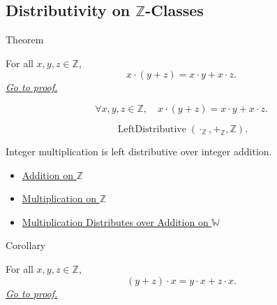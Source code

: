 \subsection*{\texorpdfstring{Distributivity on $\mathbb{Z}$-Classes}{Distributivity on Z-Classes}}

\begin{theorembox}{Theorem}
\begin{theorem}
\label{thm:left-distributivity-on-z}
For all $x,y,z\in\mathbb{Z}$,
\[
x\cdot(y+z)=x\cdot y+x\cdot z.
\]
\hyperref[prf:left-distributivity-on-z]{\textit{Go to proof.}}
\end{theorem}
\end{theorembox}

\begin{remark*}
\[
\forall x,y,z\in\mathbb{Z},\quad
x\cdot(y+z)=x\cdot y+x\cdot z.
\]
\end{remark*}

\begin{remark*}
\[
\operatorname{LeftDistributive}(\cdot_{\mathbb{Z}},+_{\mathbb{Z}},\mathbb{Z}).
\]
\end{remark*}

\begin{remark*}[Interpretation]
Integer multiplication is left distributive over integer addition.
\end{remark*}

\begin{dependencies}
\begin{itemize}
  \item \hyperref[def:addition-on-z-classes]{Addition on $\mathbb{Z}$}
  \item \hyperref[def:multiplication-on-z-classes]{Multiplication on $\mathbb{Z}$}
  \item \hyperref[thm:multiplication-distributes-over-addition-on-w]{Multiplication Distributes over Addition on $\mathbb{W}$}
\end{itemize}
\end{dependencies}

\begin{corollarybox}{Corollary}
\begin{corollary}
\label{cor:right-distributivity-on-z}
For all $x,y,z\in\mathbb{Z}$,
\[
(y+z)\cdot x=y\cdot x+z\cdot x.
\]
\hyperref[prf:right-distributivity-on-z]{\textit{Go to proof.}}
\end{corollary}
\end{corollarybox}


